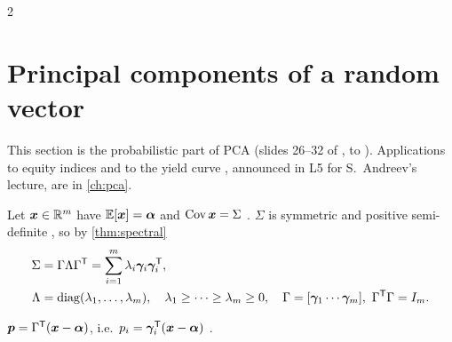 \begin{paracol}{2}
\section{Principal components of a random vector}\label{ch03:sec-pca}

\begin{coursenote}[Scope]
This section is the probabilistic part of PCA (slides 26--32 of ,  to
). Applications to equity indices and to the yield curve , announced in L5 for
S.~Andreev's lecture, are in \cref{ch:pca}.
\end{coursenote}

Let $\bm x\in\mathbb{R}^m$ have $\mathbb{E}[\bm x]=\bm\alpha$ and $\operatorname{Cov}\bm x=\Sigma$ . $\Sigma$ is symmetric and positive
semi-definite , so by \cref{thm:spectral}
\begin{align*}
  \Sigma&=\Gamma\Lambda\Gamma^{\mathsf T}=\sum_{i=1}^m\lambda_i\bm\gamma_i\bm\gamma_i^{\mathsf T},\\
  \Lambda&=\operatorname{diag}(\lambda_1,\dots,\lambda_m),\quad
  \lambda_1\ge\dots\ge\lambda_m\ge0,\quad
  \Gamma=[\bm\gamma_1\cdots\bm\gamma_m],\ \Gamma^{\mathsf T}\Gamma=I_m .
\end{align*}

\begin{definition}
$\bm p=\Gamma^{\mathsf T}(\bm x-\bm\alpha)$, i.e.\ $p_i=\bm\gamma_i^{\mathsf T}(\bm x-\bm\alpha)$ .
\end{definition}


\end{paracol}
